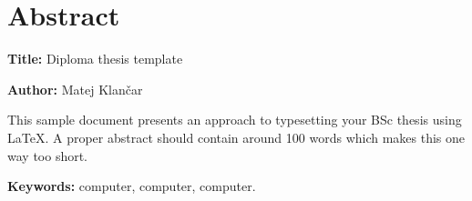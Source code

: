 \documentclass[a4paper,12pt,openright]{book}
\newcommand{\ttitleEn}{Diploma thesis template}
\newcommand{\tauthor}{Matej Klančar}
\newcommand{\tkeywordsEn}{computer, computer, computer}
\newcommand{\clearemptydoublepage}{\newpage{\pagestyle{empty}\cleardoublepage}}
\begin{document}
{}
\chapter*{Abstract}

\noindent\textbf{Title:} \ttitleEn
\bigskip

\noindent\textbf{Author:} \tauthor
\bigskip

\noindent This sample document presents an approach to typesetting your BSc thesis using \LaTeX.
A proper abstract should contain around 100 words which makes this one way too short.
\bigskip

\noindent\textbf{Keywords:} \tkeywordsEn.
\clearemptydoublepage

\mainmatter
\setcounter{page}{1}
\pagestyle{fancy}











\printbibliography
\end{document}
